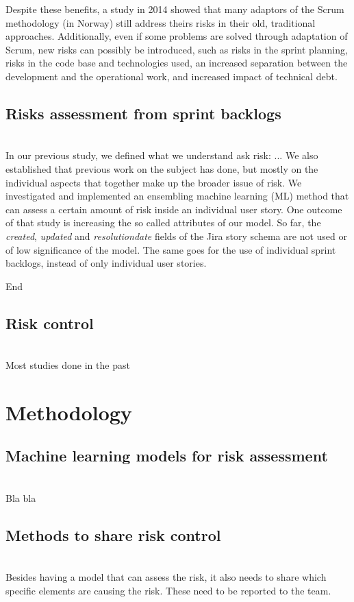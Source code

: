 \documentclass[sigconf]{acmart}
\begin{document}
Despite these benefits, a study in 2014 showed that many adaptors of the Scrum methodology (in Norway) still address theirs risks in their old, traditional approaches.\cite{siddique2014practical} Additionally, even if some problems are solved through adaptation of Scrum, new risks can possibly be introduced, such as risks in the sprint planning, risks in the code base and technologies used, an increased separation between the development and the operational work, and increased impact of technical debt\cite{kruchten2012technical}\cite{walczak2013risks}. \\

\subsection{Risks assessment from sprint backlogs} \\
In our previous study, we defined what we understand ask risk: ...
We also established that previous work on the subject has done, but mostly on the individual aspects that together make up the broader issue of risk. We investigated and implemented an ensembling machine learning (ML) method that can assess a certain amount of risk inside an individual user story. One outcome of that study is increasing the so called attributes of our model. So far, the \emph{created}, \emph{updated} and \emph{resolutiondate} fields of the Jira story schema are not used or of low significance of the model. The same goes for the use of individual sprint backlogs, instead of only individual user stories.

End\\

\subsection{Risk control} \\
Most studies done in the past   \\


\section{Methodology}

\subsection{Machine learning models for risk assessment}\\
Bla bla

\subsection{Methods to share risk control}\\
Besides having a model that can assess the risk, it also needs to share which specific elements are causing the risk. These need to be reported to the team.
\end{document}
